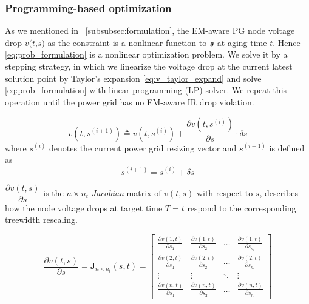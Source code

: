 \subsubsection{Programming-based optimization}
\label{subsubsec:slp_framework}

As we mentioned in ~\ref{subsubsec:formulation}, the EM-aware PG node voltage drop $\textit{v(t,s)}$ as the constraint is a nonlinear function to $\textit{\textbf{s}}$ at aging time $\textit{t}$. Hence \eqref{eq:prob_formulation} is a nonlinear optimization problem. 
We solve it by a stepping strategy, in which we linearize the voltage drop at the current latest solution point by Taylor's expansion \eqref{eq:v_taylor_expand} and solve \eqref{eq:prob_formulation} with linear programming (LP) solver. We repeat this operation until the power grid has no EM-aware IR drop violation.

\begin{equation}
	\label{eq:v_taylor_expand}
	v(t, s^{(i+1)}) \triangleq v(t,s^{(i)}) + \dfrac{\partial v(t, s^{(i)})}{\partial s} \cdot \delta s
\end{equation}
where $s^{(i)}$ denotes the current power grid resizing vector and $s^{(i+1)}$ is defined as 
\begin{equation}
	\label{eq:s}
	s^{(i+1)} = s^{(i)} + \delta s 
\end{equation}

$ \dfrac{\partial v(t, s)}{\partial s}$ is the $n\times n_{t}$ \textit{Jacobian} matrix of $v(t,s)$ with respect to $s$, describes how the node voltage drops at target time $T=t$ respond to the corresponding treewidth rescaling.

\begin{equation}
	\label{eq:J_matrix}
	\dfrac{\partial v(t, s)}{\partial s}=
	\mathbf {J}_{n\times n_{t}}(s,t) =
	\begin{bmatrix}
		\frac{\partial v(1,t)}{\partial s_{1}}&\frac{\partial v(1,t)}{\partial s_{2}}&\ldots&\frac{\partial v(1,t)}{\partial s_{n_{t}}}\\
		\frac{\partial v(2,t)}{\partial s_{1}}&\frac{\partial v(2,t)}{\partial s_{2}}&\ldots&\frac{\partial v(2,t)}{\partial s_{n_{t}}}\\
		\vdots&\vdots&\ddots&\vdots\\
		\frac{\partial v(n,t)}{\partial s_{1}}&\frac{\partial v(n,t)}{\partial s_{2}}&\ldots&\frac{\partial v(n,t)}{\partial s_{n_{t}}}
	\end{bmatrix}
\end{equation}



